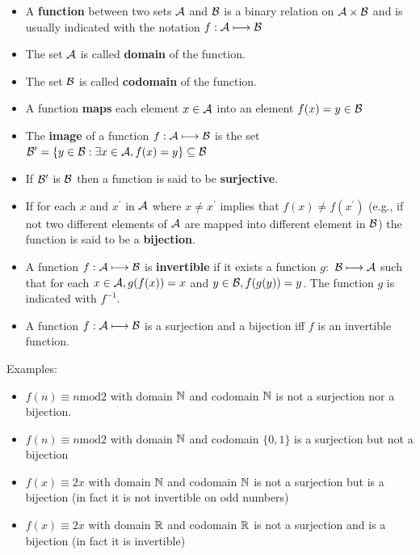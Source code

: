 \documentclass[justified,sixbynine]{tufte-book}
\def\func{\textrm}
\theoremstyle{plain}%
\theoremstyle{definition}
\theoremstyle{remark}
\begin{document}
\begin{fullwidth}
\begin{itemize}
\item  A {\bf function} between two sets ${\cal A}$ and ${\cal B}$ is a
binary relation on ${\cal A}\times {\cal B}$ and is usually indicated with
the notation $f:{\cal A}\longmapsto {\cal B}$

\item  The set ${\cal A}$ is called {\bf domain} of the function.

\item  The set ${\cal B}$ is called {\bf codomain} of the function.

\item  A function {\bf maps} each element $x\in {\cal A}$ into an element $%
f(x)=y\in {\cal B}$

\item  The {\bf image} of a function $f:{\cal A}\longmapsto {\cal B}$ is the
set ${\cal B}^{\prime }=\{y\in {\cal B}:\exists x\in {\cal A}%
,f(x)=y\}\subseteq {\cal B}$

\item  If ${\cal B}^{\prime }$ is ${\cal B}$ then a function is said to be
{\bf surjective}.

\item  If for each $x$ and $x^{\prime }$ in ${\cal A}$ where $x\neq
x^{\prime }$ implies that $f(x)\neq f(x^{\prime })$ (e.g., if not two
different elements of ${\cal A}$ are mapped into different element in ${\cal B%
}$) the function is said to be a {\bf bijection}.

\item  A function $f:{\cal A}\longmapsto {\cal B}$ is {\bf invertible} if it
exists a function $g:$ ${\cal B}\longmapsto {\cal A}$ such that for each $%
x\in {\cal A},g(f(x))=x$ and $y\in {\cal B},f(g(y))=y$. The function $g$ is
indicated with $f^{-1}$.

\item  A function $f:{\cal A}\longmapsto {\cal B}$ is a surjection and a
bijection iff $f$ is an invertible function.
\end{itemize}

Examples:

\begin{itemize}
\item
$f(n)\equiv n\func{mod}2$ with domain ${\Bbb N}$ and codomain $%
{\Bbb N}$ is not a surjection nor a bijection.
\item
$f(n)\equiv n\func{mod}2$ with domain ${\Bbb N}$ and codomain $%
\{0,1\}$ is a surjection but not a bijection
\item
$f(x)\equiv 2x$ with domain ${\Bbb N}$ and codomain ${\Bbb N}$ is
not a surjection but is a bijection (in fact it is not invertible on odd
numbers)
\item
$f(x)\equiv 2x$ with domain ${\Bbb R}$ and codomain ${\Bbb R}$ is
not a surjection and is a bijection (in fact it is invertible)
\end{itemize}


\end{fullwidth}
\end{document}
